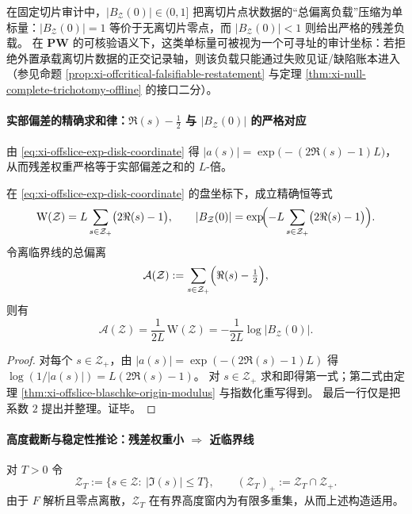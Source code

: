 \begin{remark}\label{rem:xi-offslice-origin-modulus-contract-loss}
在固定切片审计中，\(|B_{\mathcal Z}(0)|\in(0,1]\) 把离切片点状数据的“总偏离负载”压缩为单标量：\(|B_{\mathcal Z}(0)|=1\) 等价于无离切片零点，而 \(|B_{\mathcal Z}(0)|<1\) 则给出严格的残差负载。
在 \(\mathbf{PW}\) 的可核验语义下，这类单标量可被视为一个可寻址的审计坐标：若拒绝外置承载离切片数据的正交记录轴，则该负载只能通过失败见证/缺陷账本进入（参见命题 \ref{prop:xi-offcritical-falsifiable-restatement} 与定理 \ref{thm:xi-null-complete-trichotomy-offline} 的接口二分）。
\end{remark}

\paragraph{实部偏差的精确求和律：\texorpdfstring{$\Re(s)-\tfrac12$}{Re(s)-1/2} 与 \texorpdfstring{$|B_{\mathcal Z}(0)|$}{|B(0)|} 的严格对应}
由 \eqref{eq:xi-offslice-exp-disk-coordinate} 得
\(
|a(s)|=\exp\!\bigl(-(2\Re(s)-1)L\bigr)
\)，从而残差权重严格等于实部偏差之和的 \(L\)-倍。

\begin{theorem}[实部偏差求和律]\label{thm:xi-offslice-realpart-sum-law}
在 \eqref{eq:xi-offslice-exp-disk-coordinate} 的盘坐标下，成立精确恒等式
\[
\mathrm{W}(\mathcal Z)
= L\sum_{s\in\mathcal Z_{+}}\bigl(2\Re(s)-1\bigr),
\qquad
|B_{\mathcal Z}(0)|
=\exp\!\Bigl(-L\sum_{s\in\mathcal Z_{+}}\bigl(2\Re(s)-1\bigr)\Bigr).
\]
令离临界线的总偏离
\[
\mathcal A(\mathcal Z):=\sum_{s\in\mathcal Z_{+}}\Bigl(\Re(s)-\tfrac12\Bigr),
\]
则有
\[
\mathcal A(\mathcal Z)=\frac{1}{2L}\,\mathrm{W}(\mathcal Z)
=-\frac{1}{2L}\log|B_{\mathcal Z}(0)|.
\]
\end{theorem}

\begin{proof}
对每个 \(s\in\mathcal Z_{+}\)，由 \(|a(s)|=\exp(-(2\Re(s)-1)L)\) 得
\(
\log(1/|a(s)|)=L(2\Re(s)-1)
\)。
对 \(s\in\mathcal Z_{+}\) 求和即得第一式；第二式由定理 \ref{thm:xi-offslice-blaschke-origin-modulus} 与指数化重写得到。
最后一行仅是把系数 \(2\) 提出并整理。证毕。
\end{proof}

\paragraph{高度截断与稳定性推论：残差权重小 \texorpdfstring{$\Rightarrow$}{->} 近临界线}
对 \(T>0\) 令
\[
\mathcal Z_T:=\{s\in\mathcal Z:\ |\Im(s)|\le T\},
\qquad
(\mathcal Z_T)_{+}:=\mathcal Z_T\cap\mathcal Z_{+}.
\]
由于 \(F\) 解析且零点离散，\(\mathcal Z_T\) 在有界高度窗内为有限多重集，从而上述构造适用。

